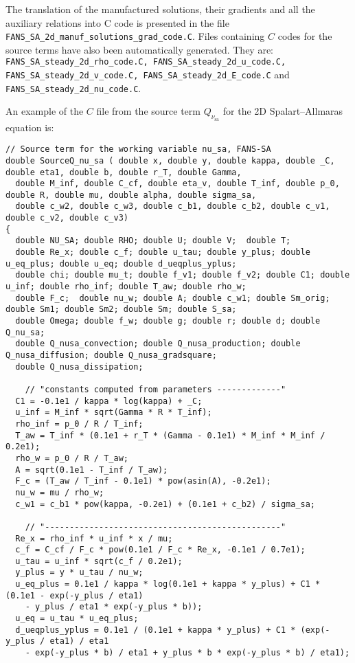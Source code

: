 \documentclass[10pt]{article}
\newcommand{\sa}{\nu_{\mathrm{sa}}}
\begin{document}
The translation of the manufactured solutions, their gradients and all the auxiliary relations into C code is presented in the file \texttt{FANS\_SA\_2d\_manuf\_solutions\_grad\_code.C}. Files containing $C$ codes for the source terms have also been automatically generated. They are: \texttt{FANS\_SA\_steady\_2d\_rho\_code.C, FANS\_SA\_steady\_2d\_u\_code.C, FANS\_SA\_steady\_2d\_v\_code.C, FANS\_SA\_steady\_2d\_E\_code.C} and \texttt{FANS\_SA\_steady\_2d\_nu\_code.C}.

An example of the $C$ file from the source term $Q_{\sa}$ for the 2D Spalart--Allmaras equation is:

\begin{footnotesize}
\begin{verbatim}// Source term for the working variable nu_sa, FANS-SA
double SourceQ_nu_sa ( double x, double y, double kappa, double _C, double eta1, double b, double r_T, double Gamma, 
  double M_inf, double C_cf, double eta_v, double T_inf, double p_0, double R, double mu, double alpha, double sigma_sa,
  double c_w2, double c_w3, double c_b1, double c_b2, double c_v1, double c_v2, double c_v3)
{
  double NU_SA; double RHO; double U; double V;  double T;
  double Re_x; double c_f; double u_tau; double y_plus; double u_eq_plus; double u_eq; double d_ueqplus_yplus;
  double chi; double mu_t; double f_v1; double f_v2; double C1; double u_inf; double rho_inf; double T_aw; double rho_w;
  double F_c;  double nu_w; double A; double c_w1; double Sm_orig; double Sm1; double Sm2; double Sm; double S_sa;
  double Omega; double f_w; double g; double r; double d; double Q_nu_sa; 
  double Q_nusa_convection; double Q_nusa_production; double Q_nusa_diffusion; double Q_nusa_gradsquare;
  double Q_nusa_dissipation;

    // "constants computed from parameters -------------"
  C1 = -0.1e1 / kappa * log(kappa) + _C;
  u_inf = M_inf * sqrt(Gamma * R * T_inf);
  rho_inf = p_0 / R / T_inf;
  T_aw = T_inf * (0.1e1 + r_T * (Gamma - 0.1e1) * M_inf * M_inf / 0.2e1);
  rho_w = p_0 / R / T_aw;
  A = sqrt(0.1e1 - T_inf / T_aw);
  F_c = (T_aw / T_inf - 0.1e1) * pow(asin(A), -0.2e1);
  nu_w = mu / rho_w;
  c_w1 = c_b1 * pow(kappa, -0.2e1) + (0.1e1 + c_b2) / sigma_sa;

    // "------------------------------------------------"
  Re_x = rho_inf * u_inf * x / mu;
  c_f = C_cf / F_c * pow(0.1e1 / F_c * Re_x, -0.1e1 / 0.7e1);
  u_tau = u_inf * sqrt(c_f / 0.2e1);
  y_plus = y * u_tau / nu_w;
  u_eq_plus = 0.1e1 / kappa * log(0.1e1 + kappa * y_plus) + C1 * (0.1e1 - exp(-y_plus / eta1) 
    - y_plus / eta1 * exp(-y_plus * b));
  u_eq = u_tau * u_eq_plus;
  d_ueqplus_yplus = 0.1e1 / (0.1e1 + kappa * y_plus) + C1 * (exp(-y_plus / eta1) / eta1 
    - exp(-y_plus * b) / eta1 + y_plus * b * exp(-y_plus * b) / eta1);
   

\end{verbatim}
\end{footnotesize}
\end{document}

